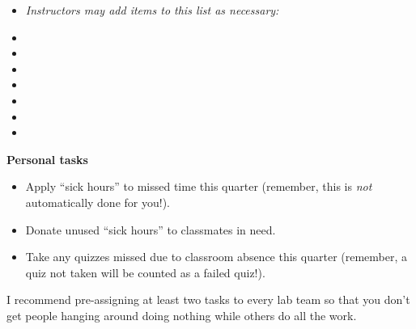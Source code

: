\filbreak

\begin{itemize}
\item{} {\it Instructors may add items to this list as necessary:}
\vskip 10pt
\item{} \underbar{\hskip 50pt} 
\vskip 10pt
\item{} \underbar{\hskip 50pt} 
\vskip 10pt
\item{} \underbar{\hskip 50pt} 
\vskip 10pt
\item{} \underbar{\hskip 50pt} 
\vskip 10pt
\item{} \underbar{\hskip 50pt} 
\vskip 10pt
\item{} \underbar{\hskip 50pt} 
\vskip 10pt
\item{} \underbar{\hskip 50pt} 
\end{itemize}


\filbreak

\noindent
{\bf Personal tasks}

\begin{itemize}
\item{} Apply ``sick hours'' to missed time this quarter (remember, this is {\it not} automatically done for you!).
\item{} Donate unused ``sick hours'' to classmates in need.
\item{} Take any quizzes missed due to classroom absence this quarter (remember, a quiz not taken will be counted as a failed quiz!).
\end{itemize}







 






I recommend pre-assigning at least two tasks to every lab team so that you don't get people hanging around doing nothing while others do all the work.






